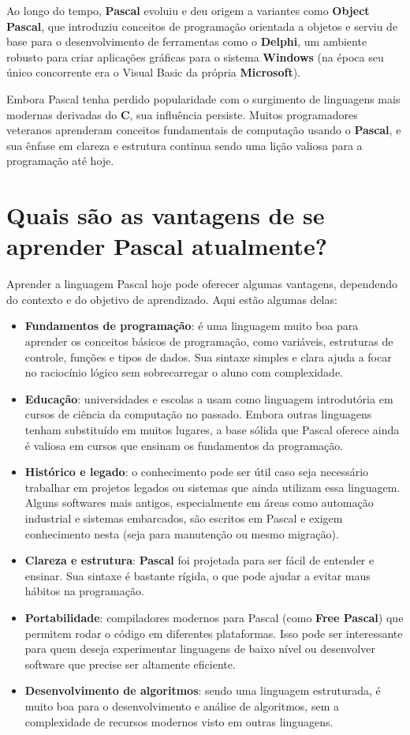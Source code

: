 Ao longo do tempo, \textbf{Pascal} evoluiu e deu origem a variantes como \textbf{Object Pascal}, que introduziu conceitos de programação orientada a objetos e serviu de base para o desenvolvimento de ferramentas como o \textbf{Delphi}, um ambiente robusto para criar aplicações gráficas para o sistema \textbf{Windows} (na época seu único concorrente era o Visual Basic da própria \textbf{Microsoft}).

Embora Pascal tenha perdido popularidade com o surgimento de linguagens mais modernas derivadas do \textbf{C}, sua influência persiste. Muitos programadores veteranos aprenderam conceitos fundamentais de computação usando o \textbf{Pascal}, e sua ênfase em clareza e estrutura continua sendo uma lição valiosa para a programação até hoje.

\section{Quais são as vantagens de se aprender Pascal atualmente?}
Aprender a linguagem Pascal hoje pode oferecer algumas vantagens, dependendo do contexto e do objetivo de aprendizado. Aqui estão algumas delas:
\begin{itemize}
	\item \textbf{Fundamentos de programação}: é uma linguagem muito boa para aprender os conceitos básicos de programação, como variáveis, estruturas de controle, funções e tipos de dados. Sua sintaxe simples e clara ajuda a focar no raciocínio lógico sem sobrecarregar o aluno com complexidade.
	\item \textbf{Educação}: universidades e escolas a usam como linguagem introdutória em cursos de ciência da computação no passado. Embora outras linguagens tenham substituído em muitos lugares, a base sólida que Pascal oferece ainda é valiosa em cursos que ensinam os fundamentos da programação.
	\item \textbf{Histórico e legado}: o conhecimento pode ser útil caso seja necessário trabalhar em projetos legados ou sistemas que ainda utilizam essa linguagem. Alguns softwares mais antigos, especialmente em áreas como automação industrial e sistemas embarcados, são escritos em Pascal e exigem conhecimento nesta (seja para manutenção ou mesmo migração).
	\item \textbf{Clareza e estrutura}: \textbf{Pascal} foi projetada para ser fácil de entender e ensinar. Sua sintaxe é bastante rígida, o que pode ajudar a evitar maus hábitos na programação.
	\item \textbf{Portabilidade}: compiladores modernos para Pascal (como \textbf{Free Pascal}) que permitem rodar o código em diferentes plataformas. Isso pode ser interessante para quem deseja experimentar linguagens de baixo nível ou desenvolver software que precise ser altamente eficiente.
	\item \textbf{Desenvolvimento de algoritmos}: sendo uma linguagem estruturada, é muito boa para o desenvolvimento e análise de algoritmos, sem a complexidade de recursos modernos visto em outras linguagens.
\end{itemize}
